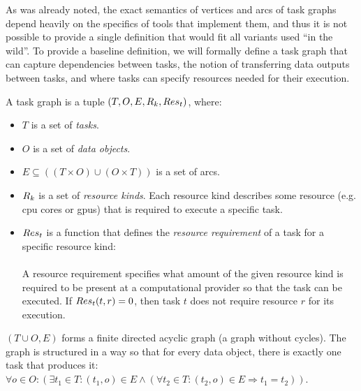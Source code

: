 As was already noted, the exact semantics of vertices and arcs of task graphs depend heavily on the
specifics of tools that implement them, and thus it is not possible to provide a single definition
that would fit all variants used ``in the wild''. To provide a baseline definition, we will
formally define a task graph that can capture dependencies between tasks, the notion of
transferring data outputs between tasks, and where tasks can specify resources needed for their
execution.

\newcommand{\alltaskpairs}{\forall t_1\in{}T, \forall t_2\in{}T}

A task graph is a tuple $(T, O, E, R_k, Res_t)$, where:
\begin{itemize}[itemsep=0pt]
	\item $T$ is a set of \emph{tasks}.
	\item $O$ is a set of \emph{data objects}.
	\item $E \subseteq ((T\times{}O) \cup (O\times{}T))$ is a set of arcs.
	\item $R_k$ is a set of \emph{resource kinds}. Each resource kind describes some resource
	      (e.g. \gls{cpu} cores or \glspl{gpu})
	      that is required to execute a specific task.
	\item[\makedef{def:task_resreq}] $Res_t$ is a function that defines the
	\emph{resource requirement} of a task for a specific resource kind: \\
	 \\
	A resource requirement specifies what amount
	      of the given resource kind is required to be present at a computational provider so that the task
	      can be executed. If $Res_t(t, r) = 0$, then task
	      $t$ does not require resource $r$ for its execution.
\end{itemize}

$(T \cup O, E)$ forms a finite directed acyclic graph (a graph without cycles). The graph is
structured in a way so that for every data
object, there is exactly one task that produces it: \\ $\forall o\in{}O: (\exists t_1\in{}T: (t_1, o) \in E \land
	(\forall t_2\in{}T: (t_2, o) \in E \Rightarrow t_1 = t_2))$.

